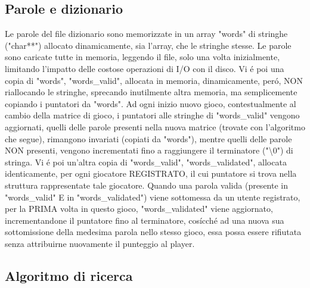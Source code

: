 \subsection{Parole e dizionario}

Le parole del file dizionario sono memorizzate in un array "words" di stringhe ("char**") allocato dinamicamente, sia l'array, che le stringhe stesse. Le parole sono caricate tutte in memoria, leggendo il file, solo una volta inizialmente, limitando l'impatto delle costose operazioni di I/O con il disco. Vi \'e poi una copia di "words", "words\_valid", allocata in memoria, dinamicamente, per\'o, NON riallocando le stringhe, sprecando inutilmente altra memoria, ma semplicemente copiando i puntatori da "words". Ad ogni inizio nuovo gioco, contestualmente al cambio della matrice di gioco, i puntatori alle stringhe di "words\_valid" vengono aggiornati, quelli delle parole presenti nella nuova matrice (trovate con l'algoritmo che segue), rimangono invariati (copiati da "words"), mentre quelli delle parole NON presenti, vengono incrementati fino a raggiungere il terminatore ("\textbackslash0") di stringa. Vi \'e poi un'altra copia di "words\_valid", "words\_validated", allocata identicamente, per ogni giocatore REGISTRATO, il cui puntatore si trova nella struttura rappresentate tale giocatore. Quando una parola valida (presente in "words\_valid" E in "words\_validated") viene sottomessa da un utente registrato, per la PRIMA volta in questo gioco, "words\_validated" viene aggiornato, incrementandone il puntatore fino al terminatore, cos\'icch\'e ad una nuova sua sottomissione della medesima parola nello stesso gioco, essa possa essere rifiutata senza attribuirne nuovamente il punteggio al player.
\\

\subsection{Algoritmo di ricerca}

